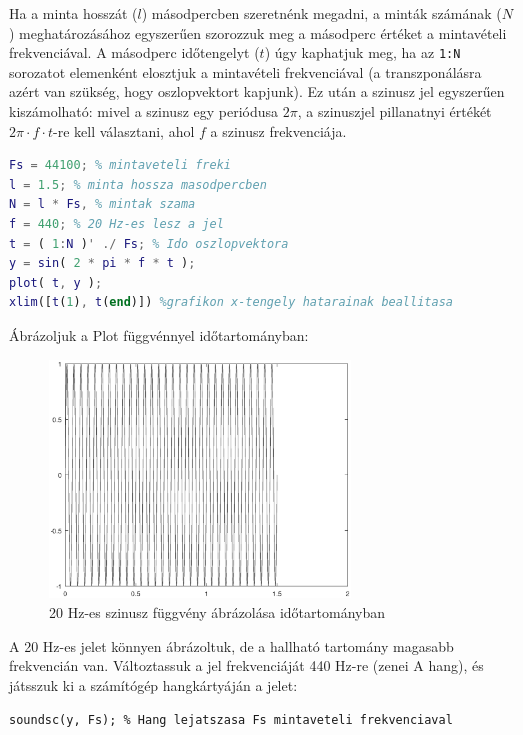 \documentclass[12pt,a4paper]{article}
\begin{document}
Ha a minta hosszát ($l$) másodpercben szeretnénk megadni, a minták számának ($N$) meghatározásához egyszerűen szorozzuk meg a másodperc értéket a mintavételi frekvenciával. A másodperc időtengelyt ($t$) úgy kaphatjuk meg, ha az \texttt{1:N} sorozatot elemenként elosztjuk a mintavételi frekvenciával (a transzponálásra azért van szükség, hogy oszlopvektort kapjunk). Ez után a szinusz jel egyszerűen kiszámolható: mivel a szinusz egy periódusa $2\pi$, a szinuszjel pillanatnyi értékét $2\pi \cdot f \cdot t$-re kell választani, ahol $f$ a szinusz frekvenciája.

\begin{lstlisting}[frame=single,language=matlab,caption=Mintavételi frekvencia beállítása és szinuszjel előállítása]
Fs = 44100; % mintaveteli freki
l = 1.5; % minta hossza masodpercben
N = l * Fs, % mintak szama
f = 440; % 20 Hz-es lesz a jel
t = ( 1:N )' ./ Fs; % Ido oszlopvektora
y = sin( 2 * pi * f * t );
plot( t, y );
xlim([t(1), t(end)]) %grafikon x-tengely hatarainak beallitasa
\end{lstlisting}

\clearpage
Ábrázoljuk a Plot függvénnyel időtartományban:

\begin{figure}[H]
\begin{center}
\includegraphics[width=8cm]{figures/modulaciok_workshop_szinusz.eps}
\caption{20 Hz-es szinusz függvény ábrázolása időtartományban}
\label{fig:szinusz}
\end{center}
\end{figure}

A 20 Hz-es jelet könnyen ábrázoltuk, de a hallható tartomány magasabb frekvencián van. Változtassuk a jel frekvenciáját 440 Hz-re (zenei A hang), és játsszuk ki a számítógép hangkártyáján a jelet:


\lstinline{soundsc(y, Fs); % Hang lejatszasa Fs mintaveteli frekvenciaval } 
\end{document}
